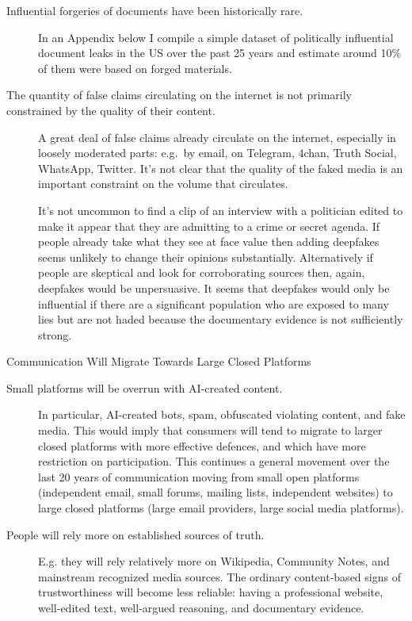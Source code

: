 \documentclass[
  10pt,
  ignorenonframetext,
]{beamer}
\begin{document}
\begin{frame}{}
\label{section-12}
\begin{description}
\item[Influential forgeries of documents have been historically rare.]
In an Appendix below I compile a simple dataset of politically
influential document leaks in the US over the past 25 years and estimate
around 10\% of them were based on forged materials.
\item[The quantity of false claims circulating on the internet is not
primarily constrained by the quality of their content.]
A great deal of false claims already circulate on the internet,
especially in loosely moderated parts: e.g.~by email, on Telegram,
4chan, Truth Social, WhatsApp, Twitter. It's not clear that the quality
of the faked media is an important constraint on the volume that
circulates.

It's not uncommon to find a clip of an interview with a politician
edited to make it appear that they are admitting to a crime or secret
agenda. If people already take what they see at face value then adding
deepfakes seems unlikely to change their opinions substantially.
Alternatively if people are skeptical and look for corroborating sources
then, again, deepfakes would be unpersuasive. It seems that deepfakes
would only be influential if there are a significant population who are
exposed to many lies but are not haded because the documentary evidence
is not sufficiently strong.
\end{description}
\end{frame}

\begin{frame}{Communication Will Migrate Towards Large Closed Platforms}
\label{communication-will-migrate-towards-large-closed-platforms}
\begin{description}
\item[Small platforms will be overrun with AI-created content.]
In particular, AI-created bots, spam, obfuscated violating content, and
fake media. This would imply that consumers will tend to migrate to
larger closed platforms with more effective defences, and which have
more restriction on participation. This continues a general movement
over the last 20 years of communication moving from small open platforms
(independent email, small forums, mailing lists, independent websites)
to large closed platforms (large email providers, large social media
platforms).
\item[People will rely more on established sources of truth.]
E.g. they will rely relatively more on Wikipedia, Community Notes, and
mainstream recognized media sources. The ordinary content-based signs of
trustworthiness will become less reliable: having a professional
website, well-edited text, well-argued reasoning, and documentary
evidence.
\end{description}
\end{frame}
\end{document}
